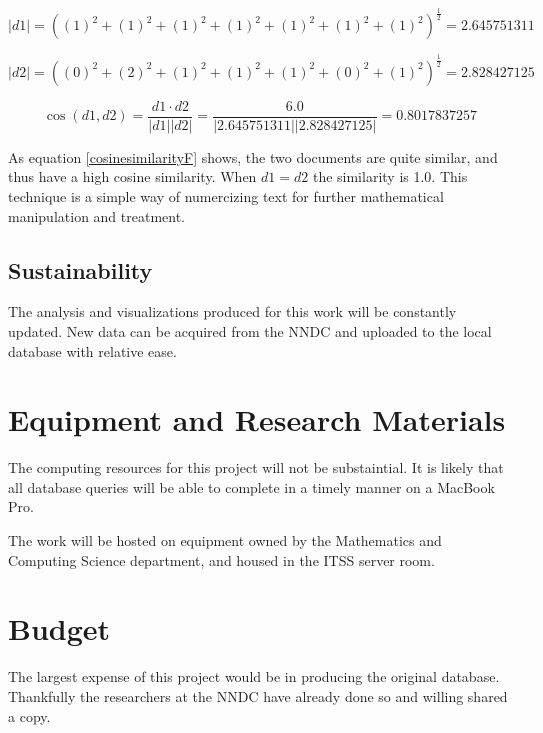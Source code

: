 \documentclass[12pt]{article}
\begin{document}
\begin{doublespacing}
\begin{equation} \label{cosinesimilarity2}
 \left| d1 \right| = \left( (1)^2 + (1)^2 + (1)^2 + (1)^2 + (1)^2 + (1)^2 + (1)^2 \right) ^{\frac{1}{2}} =  2.645751311
\end{equation}

\begin{equation} \label{cosinesimilarity3}
 \left| d2 \right| = \left( (0)^2 + (2)^2 + (1)^2 + (1)^2 + (1)^2 + (0)^2 + (1)^2 \right) ^{\frac{1}{2}} =  2.828427125
\end{equation}

\begin{equation} \label{cosinesimilarityF}
\cos (d1,d2) = \frac{d1 \cdot d2 }{\left| d1 \right| \left| d2 \right|} = \frac{6.0}{\left| 2.645751311 \right| \left| 2.828427125 \right|} = 0.8017837257
\end{equation}

As equation \ref{cosinesimilarityF} shows, the two documents are quite similar, and thus have a high cosine similarity.
When $d1 = d2$ the similarity is 1.0.
This technique is a simple way of numercizing text for further mathematical manipulation and treatment.



\subsection{Sustainability} \label{sustainability}
The analysis and visualizations produced for this work will be constantly updated.
New data can be acquired from the NNDC and uploaded to the local database with relative ease.


\pagebreak
\section{Equipment and Research Materials}

The computing resources for this project will not be substaintial.
It is likely that all database queries will be able to complete in a timely manner on a MacBook Pro.

The work will be hosted on equipment owned by the Mathematics and Computing Science department, and housed in the ITSS server room.

\pagebreak
\section{Budget}
The largest expense of this project would be in producing the original database.
Thankfully the researchers at the NNDC have already done so and willing shared a copy.


\end{doublespacing}
\end{document}
